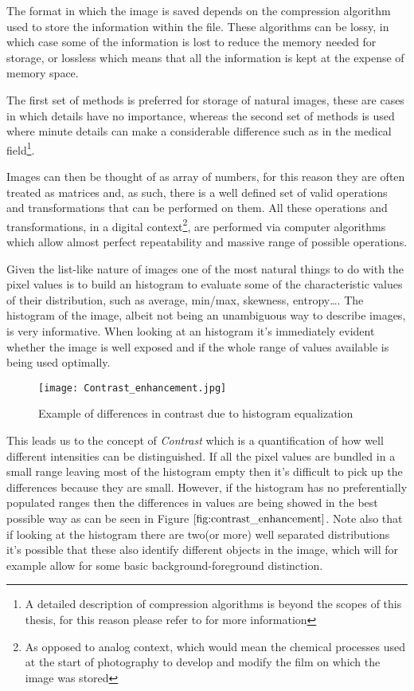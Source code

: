 The format in which the image is saved depends on the compression algorithm used to store the information within the file. These algorithms can be lossy, in which case some of the information is lost to reduce the memory needed for storage, or lossless which means that all the information is kept at the expense of memory space. 

The first set of methods is preferred for storage of natural images, these are cases in which details have no importance, whereas the second set of methods is used where minute details can make a considerable difference such as in the medical field\footnote{A detailed description of compression algorithms is beyond the scopes of this thesis, for this reason please refer to \cite{Img_Compression} for more information}.

Images can then be thought of as array of numbers, for this reason they are often treated as matrices and, as such, there is a well defined set of valid operations and transformations that can be performed on them. All these operations and transformations, in a digital context\footnote{As opposed to analog context, which would mean the chemical processes used at the start of photography to develop and modify the film on which the image was stored}, are performed via computer algorithms which allow almost perfect repeatability and massive range of possible operations.

Given the list-like nature of images one of the most natural things to do with the pixel values is to build an histogram to evaluate some of the characteristic values of their distribution, such as average, min/max, skewness, entropy\ldots. The histogram of the image, albeit not being an unambiguous way to describe images, is very informative. When looking at an histogram it's immediately evident whether the image is well exposed and if the whole range of values available is being used optimally.

\begin{figure}[H]
	\centering
  		\texttt{[image: Contrast\_enhancement.jpg]}
        \caption{Example of differences in contrast due to histogram equalization\label{fig:contrast_enhancement}}
\end{figure}

This leads us to the concept of \textit{Contrast} which is a quantification of how well different intensities can be distinguished. If all the pixel values are bundled in a small range leaving most of the histogram empty then it's difficult to pick up the differences because they are small. However, if the histogram has no preferentially populated ranges then the differences in values are being showed in the best possible way as can be seen in Figure $\ref{fig:contrast_enhancement}$. Note also that if looking at the histogram there are two(or more) well separated distributions it's possible that these also identify different objects in the image, which will for example allow for some basic background-foreground distinction.

